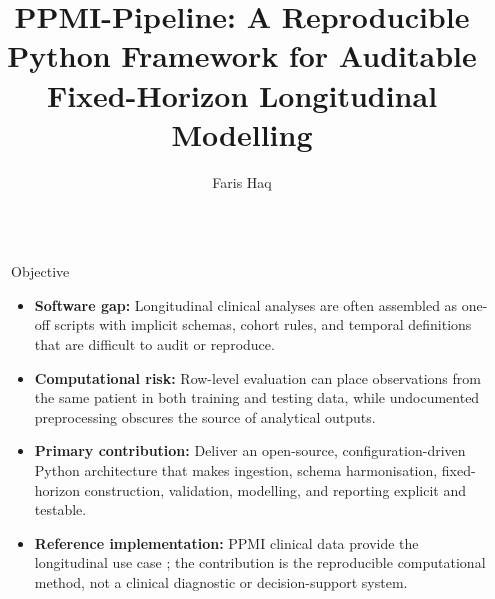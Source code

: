 \newlength{\sepwidth}
\newlength{\colwidth}
\setlength{\sepwidth}{0.025\paperwidth}
\setlength{\colwidth}{0.3\paperwidth}
\newcommand{\separatorcolumn}{\begin{column}{\sepwidth}\end{column}}

\title{PPMI-Pipeline: A Reproducible Python Framework for Auditable Fixed-Horizon Longitudinal Modelling}
\author{Faris Haq}



\begin{frame}[t]
\begin{columns}[t]

\separatorcolumn

\begin{column}{\colwidth}

\begin{block}{Objective}
\begin{itemize}
  \setlength{\itemsep}{0.35em}
  \item \textbf{Software gap:} Longitudinal clinical analyses are often assembled as one-off scripts with implicit schemas, cohort rules, and temporal definitions that are difficult to audit or reproduce.
  \item \textbf{Computational risk:} Row-level evaluation can place observations from the same patient in both training and testing data, while undocumented preprocessing obscures the source of analytical outputs.
  \item \textbf{Primary contribution:} Deliver an open-source, configuration-driven Python architecture that makes ingestion, schema harmonisation, fixed-horizon construction, validation, modelling, and reporting explicit and testable.
  \item \textbf{Reference implementation:} PPMI clinical data provide the longitudinal use case \citep{ppmi_dataset}; the contribution is the reproducible computational method, not a clinical diagnostic or decision-support system.
\end{itemize}
\end{block}

\vspace{1cm}


\end{column}
\end{columns}
\end{frame}
